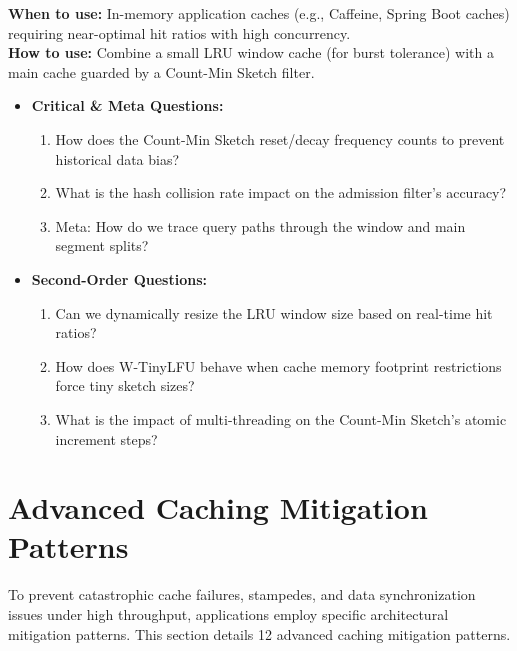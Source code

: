 \documentclass[11pt,a4paper]{article}
\theoremstyle{definition}
\begin{document}
\noindent
\textbf{When to use:} In-memory application caches (e.g., Caffeine, Spring Boot caches) requiring near-optimal hit ratios with high concurrency.\\
\textbf{How to use:} Combine a small LRU window cache (for burst tolerance) with a main cache guarded by a Count-Min Sketch filter.
\begin{itemize}[leftmargin=*]
  \item[] \textbf{Critical \& Meta Questions:}
  \begin{enumerate}
    \item How does the Count-Min Sketch reset/decay frequency counts to prevent historical data bias?
    \item What is the hash collision rate impact on the admission filter's accuracy?
    \item Meta: How do we trace query paths through the window and main segment splits?
  \end{enumerate}
  \item[] \textbf{Second-Order Questions:}
  \begin{enumerate}
    \item Can we dynamically resize the LRU window size based on real-time hit ratios?
    \item How does W-TinyLFU behave when cache memory footprint restrictions force tiny sketch sizes?
    \item What is the impact of multi-threading on the Count-Min Sketch's atomic increment steps?
  \end{enumerate}
\end{itemize}
\medskip



\section{Advanced Caching Mitigation Patterns}\label{sec:caching-mitigations}
To prevent catastrophic cache failures, stampedes, and data synchronization issues under high throughput, applications employ specific architectural mitigation patterns. This section details 12 advanced caching mitigation patterns.
\end{document}
